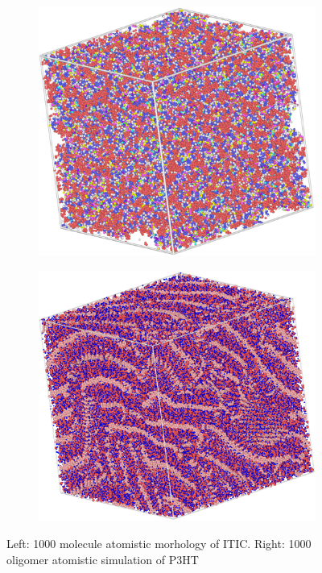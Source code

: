 \begin{figure}[]
\centering
\begin{subfigure}{.5\textwidth}
    \includegraphics[width=\textwidth]{figures/ITIC.png}
\end{subfigure}%
\begin{subfigure}{.5\textwidth}
    \includegraphics[width=\textwidth]{figures/P3HT.png}
\end{subfigure}
    \caption[short]{Left: 1000 molecule atomistic morhology of ITIC. Right: 1000 oligomer atomistic simulation
    of P3HT
    }
\label{ITIC/P3HT}
\end{figure}

